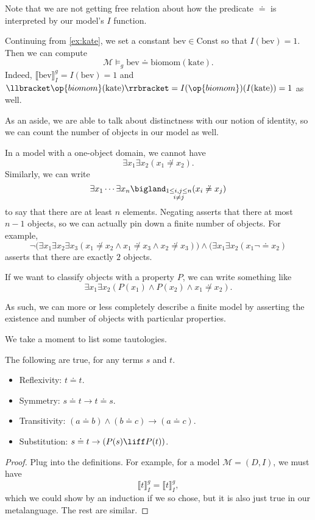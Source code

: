 \documentclass[../notes.tex]{subfiles}
\begin{document}
Note that we are not getting free relation about how the predicate $\doteq $ is interpreted by our model's $I$ function.
\begin{example}
	Continuing from \autoref{ex:kate}, we set a constant $\mathrm{bev}\in\mathrm{Const}$ so that $I(\mathrm{bev})=1$. Then we can compute
	\[\mathcal M\models_g\mathrm{bev}\doteq\mathrm{biomom}(\mathrm{kate}).\]
	Indeed, $\llbracket\mathrm{bev}\rrbracket_I^g=I(\mathrm{bev})=1$ and $\llbracket\op{biomom}(\mathrm{kate})\rrbracket=I(\op{biomom})(I(\mathrm{kate}))=1$ as well.
\end{example}
As an aside, we are able to talk about distinctness with our notion of identity, so we can count the number of objects in our model as well.
\begin{ex}
	In a model with a one-object domain, we cannot have
	\[\exists x_1\exists x_2(x_1\not\doteq x_2).\]
	Similarly, we can write
	\[\exists x_1\cdots\exists x_n\bigland_{\substack{1\le i,j\le n\\i\ne j}}(x_i\not\doteq x_j)\]
	to say that there are at least $n$ elements. Negating asserts that there at most $n-1$ objects, so we can actually pin down a finite number of objects. For example,
	\[\lnot\big(\exists x_1\exists x_2\exists x_3(x_1\not\doteq x_2\land x_1\not\doteq x_3\land x_2\not\doteq x_3)\big)\land(\exists x_1\exists x_2(x_1\lnot\doteq x_2)\]
	asserts that there are exactly $2$ objects.
\end{ex}
\begin{example}
	If we want to classify objects with a property $P$, we can write something like
	\[\exists x_1\exists x_2(P(x_1)\land P(x_2)\land x_1\not\doteq x_2).\]
\end{example}
As such, we can more or less completely describe a finite model by asserting the existence and number of objects with particular properties.

We take a moment to list some tautologies.
\begin{proposition}
	The following are true, for any terms $s$ and $t$.
	\begin{itemize}
		\item Reflexivity: $t\doteq t$.
		\item Symmetry: $s\doteq t\to t\doteq s$.
		\item Transitivity: $(a\doteq b)\land (b\doteq c)\to(a\doteq c)$.
		\item Substitution: $s\doteq t\to(P(s)\liff P(t))$.
	\end{itemize}
\end{proposition}
\begin{proof}
	Plug into the definitions. For example, for a model $\mathcal M=(D,I)$, we must have
	\[\llbracket t\rrbracket_I^g=\llbracket t\rrbracket_I^g,\]
	which we could show by an induction if we so chose, but it is also just true in our metalanguage. The rest are similar.
\end{proof}
\end{document}
